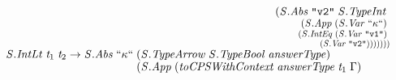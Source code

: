 \documentclass[10pt]{article}
\newcommand{\Conid}[1]{\mathit{#1}}
\newcommand{\Varid}[1]{\mathit{#1}}
\begin{document}
\begin{hscode}
${\hskip1.00em\relax\hskip1.00em\relax\phantom{\Conid{\Conid{S}.IntEq}\;\Varid{t}_{1}\;\Varid{t}_{2}\to \Conid{\Conid{S}.Abs}\;\text{``}\kappa\text{``}\;\mbox{}}\phantom{(\Conid{\Conid{S}.App}\;\mbox{}}\phantom{(\Conid{\Conid{S}.Abs}\;\text{\tt \char34 v1\char34}\;\mbox{}}\phantom{(\Conid{\Conid{S}.App}\;\mbox{}}(\Conid{\Conid{S}.Abs}\;\text{\tt \char34 v2\char34}\;\Conid{\Conid{S}.TypeInt}\;}$\\
${\hskip1.00em\relax\hskip1.00em\relax\phantom{\Conid{\Conid{S}.IntEq}\;\Varid{t}_{1}\;\Varid{t}_{2}\to \Conid{\Conid{S}.Abs}\;\text{``}\kappa\text{``}\;\mbox{}}\phantom{(\Conid{\Conid{S}.App}\;\mbox{}}\phantom{(\Conid{\Conid{S}.Abs}\;\text{\tt \char34 v1\char34}\;\mbox{}}\phantom{(\Conid{\Conid{S}.App}\;\mbox{}}\phantom{(\Conid{\Conid{S}.Abs}\;\text{\tt \char34 v2\char34}\;\mbox{}}(\Conid{\Conid{S}.App}\;(\Conid{\Conid{S}.Var}\;\text{``}\kappa\text{``})\;}$\\
${\hskip1.00em\relax\hskip1.00em\relax\phantom{\Conid{\Conid{S}.IntEq}\;\Varid{t}_{1}\;\Varid{t}_{2}\to \Conid{\Conid{S}.Abs}\;\text{``}\kappa\text{``}\;\mbox{}}\phantom{(\Conid{\Conid{S}.App}\;\mbox{}}\phantom{(\Conid{\Conid{S}.Abs}\;\text{\tt \char34 v1\char34}\;\mbox{}}\phantom{(\Conid{\Conid{S}.App}\;\mbox{}}\phantom{(\Conid{\Conid{S}.Abs}\;\text{\tt \char34 v2\char34}\;\mbox{}}\phantom{(\Conid{\Conid{S}.App}\;\mbox{}}(\Conid{\Conid{S}.IntEq}\;(\Conid{\Conid{S}.Var}\;\text{\tt \char34 v1\char34})\;}$\\
${\hskip1.00em\relax\hskip1.00em\relax\phantom{\Conid{\Conid{S}.IntEq}\;\Varid{t}_{1}\;\Varid{t}_{2}\to \Conid{\Conid{S}.Abs}\;\text{``}\kappa\text{``}\;\mbox{}}\phantom{(\Conid{\Conid{S}.App}\;\mbox{}}\phantom{(\Conid{\Conid{S}.Abs}\;\text{\tt \char34 v1\char34}\;\mbox{}}\phantom{(\Conid{\Conid{S}.App}\;\mbox{}}\phantom{(\Conid{\Conid{S}.Abs}\;\text{\tt \char34 v2\char34}\;\mbox{}}\phantom{(\Conid{\Conid{S}.App}\;\mbox{}}\phantom{(\Conid{\Conid{S}.IntEq}\;\mbox{}}(\Conid{\Conid{S}.Var}\;\text{\tt \char34 v2\char34})))))))}$\\
${\hskip1.00em\relax\hskip1.00em\relax\Conid{\Conid{S}.IntLt}\;\Varid{t}_{1}\;\Varid{t}_{2}\to \Conid{\Conid{S}.Abs}\;\text{``}\kappa\text{``}\;(\Conid{\Conid{S}.TypeArrow}\;\Conid{\Conid{S}.TypeBool}\;\Varid{answerType})\;}$\\
${\hskip1.00em\relax\hskip1.00em\relax\phantom{\Conid{\Conid{S}.IntLt}\;\Varid{t}_{1}\;\Varid{t}_{2}\to \Conid{\Conid{S}.Abs}\;\text{``}\kappa\text{``}\;\mbox{}}(\Conid{\Conid{S}.App}\;(\Varid{toCPSWithContext}\;\Varid{answerType}\;\Varid{t}_{1}\;\Gamma)\;}$\\

\end{hscode}
\end{document}
